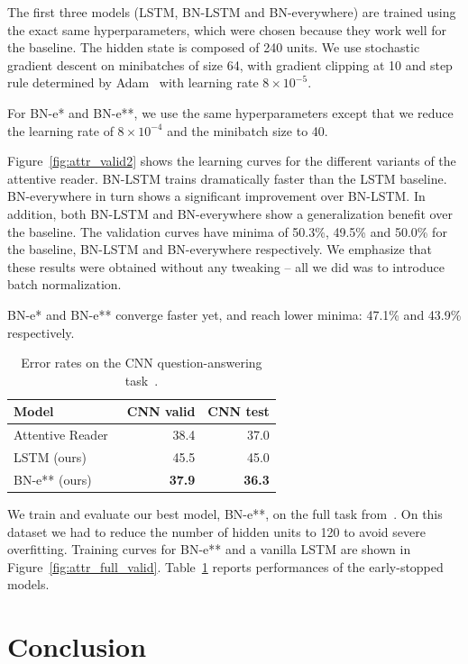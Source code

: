 \documentclass{article} %
\begin{document}
The first three models (LSTM, BN-LSTM and BN-everywhere) are trained using the
exact same hyperparameters, which were chosen because they work well for the
baseline.  The hidden state is composed of 240 units.  We use stochastic
gradient descent on minibatches of size 64, with gradient clipping at 10 and
step rule determined by Adam~\citep{kingma2014adam} with learning rate $8
\times 10^{-5}$.

For BN-e* and BN-e**, we use the same hyperparameters except that we reduce the
learning rate of $8 \times 10^{-4}$ and the minibatch size to 40.

Figure~\ref{fig:attr_valid2} shows the learning curves for the different
variants of the attentive reader.  BN-LSTM trains dramatically faster than the
LSTM baseline.  BN-everywhere in turn shows a significant improvement over
BN-LSTM.  In addition, both BN-LSTM and BN-everywhere show a generalization
benefit over the baseline.  The validation curves have minima of 50.3\%, 49.5\%
and 50.0\% for the baseline, BN-LSTM and BN-everywhere respectively.  We
emphasize that these results were obtained without any tweaking -- all we did
was to introduce batch normalization.

BN-e* and BN-e** converge faster yet, and reach lower minima: 47.1\% and 43.9\%
respectively.

\begin{table}%
  \center
  \begin{tabular}{@{}lrr@{}}
  \toprule
  \bf Model & \bf CNN valid & \bf CNN test \\
  \midrule
  Attentive Reader~\citep{attentivereader} & 38.4 & 37.0 \\
  \midrule
  LSTM (ours) & 45.5 & 45.0 \\
  BN-e** (ours) & \textbf{37.9} & \textbf{36.3} \\
  \bottomrule
\end{tabular}
\caption{Error rates on the CNN question-answering task~\citet{attentivereader}.}
\label{tab:attr_full}
\end{table}

We train and evaluate our best model, BN-e**, on the full task from~\citep{attentivereader}.
On this dataset we had to reduce the number of hidden units to 120 to avoid severe overfitting.
Training curves for BN-e** and a vanilla LSTM are shown in Figure~\ref{fig:attr_full_valid}.
Table~\ref{tab:attr_full} reports performances of the early-stopped models.

\section{Conclusion}
\end{document}
